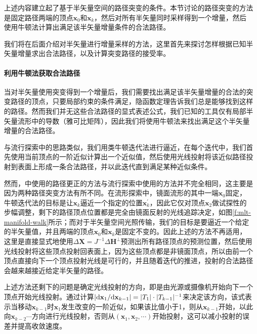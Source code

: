 上述内容建立起了基于半矢量空间的路径突变的条件。本节讨论的路径突变的方法是固定路径两端的顶点$\mathbf{x}_0$和$\mathbf{x}_k$，然后对所有半矢量同时采样得到一个增量，然后使用牛顿法计算出满足该半矢量增量条件的合法路径。

我们将在后面介绍对半矢量进行增量采样的方法，这里首先来探讨怎样根据已知半矢量增量求出合法路径，以及计算突变路径的接受率。




\paragraph{利用牛顿法获取合法路径}
当对半矢量使用突变得到一个增量后，我们需要找出满足该半矢量增量的合法的突变路径的顶点，只要局部约束的条件满足，隐函数定理告诉我们总是能够找到这样的路径。然而我们并无这些合法路径的显式表述公式，我们已知的工具仅有局部半矢量流形中的导数（雅可比矩阵），因此我们将使用牛顿法来找出满足这个半矢量增量的合法路径。

与流行探索\cite{a:ManifoldExplorationAMarkovChainMonteCarloTechniqueforRenderingSceneswithDifficultSpecularTransport}中的思路类似，我们用类牛顿迭代法进行逼近，在每个迭代中，我们首先使用当前顶点的一阶近似计算出一个近似值，然后使用光线投射将该近似路径投射到表面上形成一条合法路径，并以此迭代直到满足某种近似条件。

然而，\cite{a:TheNaturalConstraintRepresentationofthePathSpaceforEfficientLightTransportSimulation}中使用的路径更正的方法与流行探索中使用的方法并不完全相同，这主要是因为两种路径突变方法有所不同。在流形探索中，镜面流形的其中一端$\mathbf{x}_0$固定，牛顿迭代法的目标是让$\mathbf{x}_k$逼近一个指定的位置$\mathbf{x}^{'}_{k}$，因此它仅对顶点$\mathbf{x}_2$做试探性的步幅调整，剩下的路径顶点位置都是完全由镜面反射的光线追踪决定，如图\ref{f:mlt-manifold-walk}所示；而对于半矢量空间光照传输，我们的目标是要逼近一个给定的半矢量值，并且两端的顶点$\mathbf{x}_0$和$\mathbf{x}_k$是固定不变的。因此上述的方法不再适用，这里是直接显式地使用$\Delta\mathbf{X}=J^{-1}\Delta\mathbf{H}^{\perp}$预测出所有路径顶点的预测位置，然后使用光线投射将这些顶点投射回表面上，因为这些顶点都是非镜面顶点，所以由前一个顶点直接向下一个顶点投射光线是可行的，并且随着迭代的推进，投射的合法路径会越来越接近给定半矢量的路径。

上述方法还剩下的问题是确定光线投射的方向，即是由光源或摄像机开始向下一个顶点开始光线投射。\cite{a:TheNaturalConstraintRepresentationofthePathSpaceforEfficientLightTransportSimulation}通过计算$|{\rm d}\mathbf{x}_1/{\rm d}\mathbf{x}_{k-1}|=|T_1|\cdot|T_{k-1}|^{-1}$来决定该方向，该式表示当移动$\mathbf{x}_{k-1}$时$\mathbf{x}_1$发生改变的一阶近似，如果该比值小于1，则从$\mathbf{x}_{k-1}$开始，以此向$\mathbf{x}_{k-2}\cdots$方向进行光线投射，否则从$(\mathbf{x}_1,\mathbf{x}_2,\cdots)$开始投射，这可以减小投射的误差并提高收敛速度。

